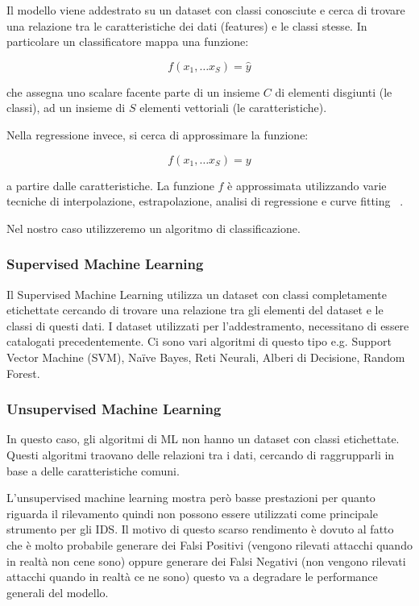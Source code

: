 Il modello viene addestrato su un dataset con classi conosciute e cerca di trovare una relazione tra le caratteristiche dei dati (features) e le classi stesse. 
In particolare un classificatore mappa una funzione: 

\[
f(x_1,\ldots x_S) = \hat y
\]

che assegna uno scalare facente parte di un insieme $C$ di elementi disgiunti (le classi), ad un insieme di $S$ elementi vettoriali (le caratteristiche). ~\cite{hoffmannBenchmarkingClassificationRegression2019}


Nella regressione invece, si cerca di approssimare la funzione: 

\[
f(x_1,\ldots x_S) = y
\]

a partire dalle caratteristiche. La funzione $f$ è approssimata utilizzando varie tecniche di interpolazione, estrapolazione, analisi di regressione e curve fitting ~\cite{hoffmannBenchmarkingClassificationRegression2019}.


Nel nostro caso utilizzeremo un algoritmo di classificazione.




\subsubsection{Supervised Machine Learning}

Il Supervised Machine Learning utilizza un dataset con classi completamente etichettate cercando di trovare una relazione tra gli elementi del dataset e le classi di questi dati. 
I dataset utilizzati per l'addestramento, necessitano di essere catalogati precedentemente.
Ci sono vari algoritmi di questo tipo e.g. Support Vector Machine (SVM), Naïve Bayes, Reti Neurali, Alberi di Decisione, Random Forest.


\subsubsection{Unsupervised Machine Learning}

In questo caso, gli algoritmi di ML non hanno un dataset con classi etichettate. Questi algoritmi traovano delle relazioni tra i dati, cercando di raggrupparli in base a delle caratteristiche comuni.

L'unsupervised machine learning mostra però basse prestazioni per quanto riguarda il rilevamento quindi non possono essere utilizzati come principale strumento per gli IDS. Il motivo di questo scarso rendimento è dovuto al fatto che è molto probabile generare dei Falsi Positivi (vengono rilevati attacchi quando in realtà non cene sono) oppure generare dei Falsi Negativi (non vengono rilevati attacchi quando in realtà ce ne sono) questo va a degradare le performance generali del modello.

